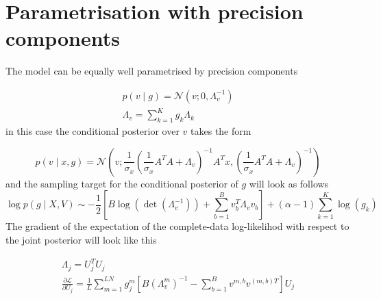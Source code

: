 \documentclass{paper}
\begin{document}
\section{Parametrisation with precision components}

The model can be equally well parametrised by precision components

\begin{eqnarray}
p(v \mid g) = \mathcal{N}(v; 0,\Lambda_v^{-1}) \\
\Lambda_v = \sum_{k=1}^K g_k \Lambda_k \label{eq:cv}
\end{eqnarray}
%
in this case the conditional posterior over $v$ takes the form

\begin{equation}
p(v \mid x,g) = \mathcal{N}\left(v; \frac{1}{\sigma_x} \left(\frac{1}{\sigma_x} A^T A + \Lambda_v \right)^{-1} A^T x, \left(\frac{1}{\sigma_x} A^T A + \Lambda_v\right)^{-1}\right)
\end{equation}
%
and the sampling target for the conditional posterior of $g$ will look as follows
\begin{equation} 
\log p(g \mid X,V) \sim -\frac{1}{2} \left[B\log(\det(\Lambda_v^{-1})) + \sum_{b=1}^B v_b^T \Lambda_v v_b\right] + (\alpha-1) \sum_{k=1}^K \log(g_k)
\end{equation}
%
The gradient of the expectation of the complete-data log-likelihod with respect to the joint posterior will look like this

\begin{eqnarray}
\Lambda_j = U_j^T U_j \\
\frac{\partial \mathcal{L}}{\partial U_j} = \frac{1}{L} \sum_{m=1}^{LN} g_j^{m} \left[ B  \left( \Lambda_v^m \right)^{-1} - \sum_{b=1}^B v^{m,b} v^{(m,b)T} \right] U_j
\end{eqnarray}
\end{document}
